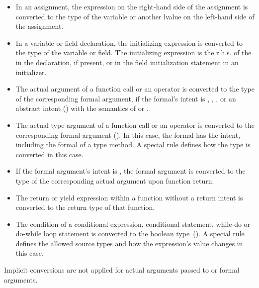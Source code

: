 \begin{itemize}
\item In an assignment, the expression on the right-hand side of
      the assignment is converted to the type of the variable
      or another lvalue on the left-hand side of the assignment.

\item In a variable or field declaration, the initializing expression
      is converted to the type of the variable or field.
      The initializing expression is the r.h.s. of the \chpl{=}
      in the declaration, if present, or in the field initialization
      statement in an initializer.

\item The actual argument of a function call or an operator is converted
      to the type of the corresponding formal argument, if the formal's
      intent is , , , or an abstract intent
      () with the semantics of
       or .

\item The actual type argument of a function call or an operator is converted
      to the corresponding formal argument ().
      In this case, the formal has the  intent, including
      the  formal of a type method.
      A special rule defines how the type is converted in this case.

\item If the formal argument's intent is , the formal argument
      is converted to the type of the corresponding actual argument
      upon function return.

\item The return or yield expression within a function without a 
      return intent is converted to the return type of that function.

\item The condition of a conditional expression,
      conditional statement, while-do or do-while loop statement
      is converted to the boolean type~().
      A special rule defines the allowed source types and
      how the expression's value changes in this case.
\end{itemize}

Implicit conversions are not applied for actual arguments passed to  or
 formal arguments.


